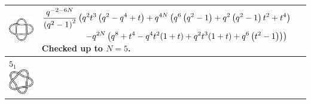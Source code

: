 \documentclass{compositio}
\theoremstyle{definition}
\numberwithin{equation}{section}
\begin{document}
{\begin{longtable}{p{}|p{}}
\includegraphics[scale=0.07,angle=0]{link4_1_2.pdf} 
& 
$
\displaystyle{%
\frac{q^{-2-6 N}}{\left(q^2-1\right)^2}} \left(q^2 t^3 \left(q^2-q^4+t\right)+q^{4 N} \left(q^6 \left(q^2-1\right)+q^2 \left(q^2-1\right) t^2+t^4\right) \right.
$
\newline
$
\displaystyle{%
\left. \qquad\qquad\quad -q^{2 N} \left(q^8+t^4-q^4 t^2 (1+t)+q^2 t^3 (1+t)+q^6 \left(t^2-1\right)\right)\right)
}
$
\newline\newline
Checked up to $N=5$.
\\
\hline
$5_{1}$ 
\includegraphics[scale=0.07,angle=0]{knot5_1.pdf} 

\end{longtable}}
\end{document}
